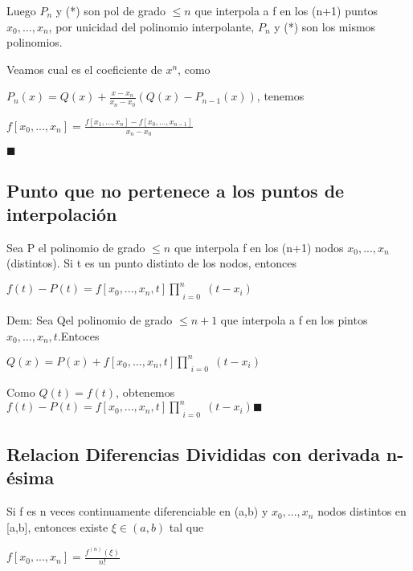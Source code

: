 \documentclass{article}
\begin{document}
Luego $P_n$ y (*) son pol de grado $\leq n$ que interpola a f en los (n+1) puntos $x_0,...,x_n$,
por unicidad del polinomio interpolante, $P_n$ y (*) son los mismos polinomios.

\vspace{5mm}

Veamos cual es el coeficiente de $x^n$, como

$P_n(x) = Q(x)+\frac{x-x_n}{x_n-x_0}(Q(x) - P_{n-1}(x))$, tenemos

$f[x_0,...,x_n] = \frac{f[x_1,...,x_n] - f[x_0,...,x_{n-1}]}{x_n - x_0}$


$\blacksquare$


\vspace{10mm}




\subsection{Punto que no pertenece a los puntos de interpolación}\label{Permutacion-De-Dif-Divididas}

Sea P el polinomio de grado $\leq n$ que interpola f en los (n+1) nodos $x_0,...,x_n$(distintos). Si t es
un punto distinto de los nodos, entonces 

$f(t) - P(t) = f[x_0,...,x_n,t]\prod\limits_{\substack{i=0}}^{n} (t-x_i)$


\vspace{5mm}

Dem:
Sea Qel polinomio de grado $\leq n+1$ que interpola a f en los pintos $x_0,...,x_n,t$.Entoces

$Q(x) = P(x) + f[x_0,...,x_n,t]\prod\limits_{\substack{i=0}}^{n} (t-x_i)$

Como $Q(t) = f(t)$, obtenemos $f(t) - P(t) = f[x_0,...,x_n,t]\prod\limits_{\substack{i=0}}^{n} (t-x_i)$$\blacksquare$

\vspace{10mm}



\subsection{Relacion Diferencias Divididas con derivada n-ésima}\label{Relacion-DIf-Divididas-con-derivada-n-esima}

Si f es n veces continuamente diferenciable en (a,b) y $x_0,...,x_n$ nodos distintos en [a,b], entonces existe
$\xi \in (a,b)$ tal que

$f[x_0,...,x_n] = \displaystyle\frac{f^{(n)}(\xi)}{n!}$
\end{document}
